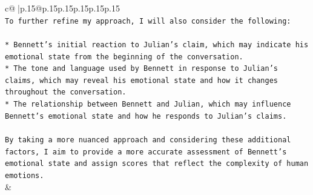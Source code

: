 \documentclass{article}
\begin{document}
{\begin{supertabular}{c@{$\;$}|p{.15\linewidth}@{}p{.15\linewidth}p{.15\linewidth}p{.15\linewidth}p{.15\linewidth}p{.15\linewidth}}
{{{\\ 
\texttt{To further refine my approach, I will also consider the following:} \\
\\ 
\texttt{* Bennett's initial reaction to Julian's claim, which may indicate his emotional state from the beginning of the conversation.} \\
\texttt{* The tone and language used by Bennett in response to Julian's claims, which may reveal his emotional state and how it changes throughout the conversation.} \\
\texttt{* The relationship between Bennett and Julian, which may influence Bennett's emotional state and how he responds to Julian's claims.} \\
\\ 
\texttt{By taking a more nuanced approach and considering these additional factors, I aim to provide a more accurate assessment of Bennett's emotional state and assign scores that reflect the complexity of human emotions.} \\
            }
        }
    }
    & \\ \\

\end{supertabular}
}
\end{document}
